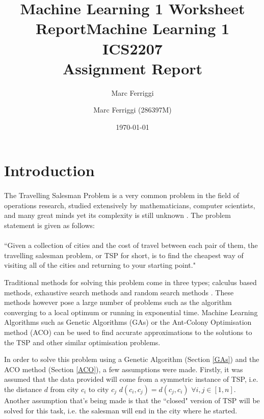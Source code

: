\documentclass[11pt,a4paper,final]{article}
\author{Marc Ferriggi}
\title{Machine Learning 1 Worksheet Report}
\begin{document}
	\title{Machine Learning 1 \\
	\large ICS2207 \\ Assignment Report}
	\author{Marc Ferriggi (286397M)}
	\date{\today}
	\maketitle
	\tableofcontents
	
	\section{Introduction}
	\label{Intro}
	\paragraph{} The Travelling Salesman Problem is a very common problem in the field of operations research, studied extensively by mathematicians, computer scientists, and many great minds yet its complexity is still unknown \cite{TSP}. The problem statement is given as follows:\\
	\hspace{0pt}\\
	``Given a collection of cities and the cost of travel between each pair of them, the travelling salesman problem, or TSP for short, is to find the cheapest way of visiting all of the cities and returning to your starting point." \cite{TSP}\\
	\par Traditional methods for solving this problem come in three types; calculus based methods, exhaustive search methods and random search methods \cite{Goldberg}. These methods however pose a large number of problems such as the algorithm converging to a local optimum or running in exponential time. Machine Learning Algorithms such as Genetic Algorithms (GAs) or the Ant-Colony Optimisation method (ACO) can be used to find accurate approximations to the solutions to the TSP and other similar optimisation problems. \\
	\par In order to solve this problem using a Genetic Algorithm (Section \ref{GAs}) and the ACO method (Section \ref{ACO}), a few assumptions were made. Firstly, it was assumed that the data provided will come from a symmetric instance of TSP, i.e. the distance $d$ from city $c_i$ to city $c_j$ $d(c_i,c_j)=d(c_j,c_i)$ $\forall i,j\in [1,n]$. Another assumption that's being made is that the ``closed" version of TSP will be solved for this task, i.e. the salesman will end in the city where he started. 
\end{document}

